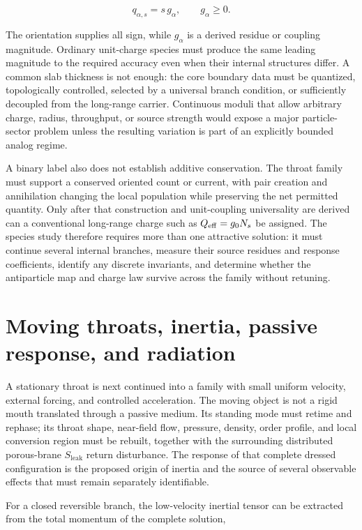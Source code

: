\[
q_{\alpha,s}=s\,g_\alpha,
\qquad
g_\alpha\ge0.
\]

The orientation supplies all sign, while \(g_\alpha\) is a derived residue or
coupling magnitude. Ordinary unit-charge species must produce the same leading
magnitude to the required accuracy even when their internal structures differ.
A common slab thickness is not enough: the core boundary data must be quantized,
topologically controlled, selected by a universal branch condition, or
sufficiently decoupled from the long-range carrier. Continuous moduli that allow
arbitrary charge, radius, throughput, or source strength would expose a major
particle-sector problem unless the resulting variation is part of an explicitly
bounded analog regime.

A binary label also does not establish additive conservation. The throat family
must support a conserved oriented count or current, with pair creation and
annihilation changing the local population while preserving the net permitted
quantity. Only after that construction and unit-coupling universality are derived
can a conventional long-range charge such as \(Q_{\rm eff}=g_0N_s\) be assigned.
The species study therefore requires more than one attractive solution: it must
continue several internal branches, measure their source residues and response
coefficients, identify any discrete invariants, and determine whether the
antiparticle map and charge law survive across the family without retuning.

\section{Moving throats, inertia, passive response, and radiation}

A stationary throat is next continued into a family with small uniform velocity,
external forcing, and controlled acceleration. The moving object is not a rigid
mouth translated through a passive medium. Its standing mode must retime and
rephase; its throat shape, near-field flow, pressure, density, order profile,
and local conversion region must be rebuilt, together with the surrounding
distributed porous-brane \(S_{\mathrm{leak}}\) return disturbance. The response
of that complete dressed configuration is the proposed origin of inertia and the
source of several observable effects that must remain separately identifiable.

For a closed reversible branch, the low-velocity inertial tensor can be extracted
from the total momentum of the complete solution,

